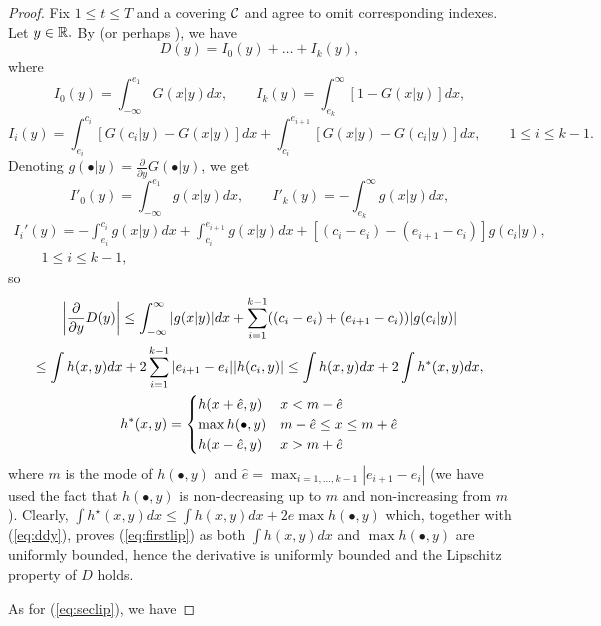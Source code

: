 \documentclass{article}              %
\begin{document}
\begin{proof}
Fix $1\leq t\leq T$ and a covering $\mathcal{C}$ and agree to omit corresponding
indexes. Let $y\in\mathbb{R}.$ By \cite{Vallander73} (or perhaps \cite{Pflug01}), we have
\[
D(y)=I_{0}(y)+\dots+I_{k}(y),
\]
where
\[
I_{0}(y)=\int_{-\infty}^{e_{1}}G(x|y)dx,\qquad I_{k}(y)=\int_{e_{k}}^{\infty}[1-G(x|y)]dx,
\]
\[
I_{i}(y)=\int_{e_{i}}^{c_{i}}[G(c_{i}|y)-G(x|y)]dx+\int_{c_{i}}^{e_{i+1}}[G(x|y)-G(c_{i}|y)]dx,
\qquad 1\leq i\leq k-1.
\]
Denoting $g(\bullet|y)=\frac{\partial}{\partial y}G(\bullet|y)$,
we get
\[
I'_{0}(y)=\int_{-\infty}^{e_{1}}g(x|y)dx,\qquad I'_{k}(y)=-\int_{e_{k}}^{\infty}g(x|y)dx,
\]
\begin{multline*}
I_{i}'(y)=-\int_{e_{i}}^{c_{i}}g(x|y)dx+\int_{c_{i}}^{e_{i+1}}g(x|y)dx+[(c_{i}-e_{i})-(e_{i+1}-c_{i})]g(c_{i}|y),\\ 
\qquad 
1\leq i\leq k-1,
\end{multline*}
so
\begin{multline}
\left|\frac{\partial}{\partial y}D(y)\right|
\leq\text{\ensuremath{\int_{-\infty}^\infty|g(x|y)|dx+
\sum_{i=1}^{k-1}((c_{i}-e_{i})+(e_{i+1}-c_{i}))}}|g(c_{i}|y)|\\
\leq\int h(x,y)dx+2\sum_{i=1}^{k-1}|e_{i+1}-e_{i}||h(c_{i},y)|\leq\int h(x,y)dx+2\int h^{*}(x,y)dx,\\
h^{*}(x,y)=\begin{cases}
h(x+\hat e,y) & x<m-\hat{e}\\
\max h(\bullet,y) & m-\hat{e}\leq x\leq m+\hat{e}\\
h(x-\hat{e},y) & x>m+\hat{e}
\end{cases}\label{eq:ddy}
\end{multline}
where $m$ is the mode of $h(\bullet,y)$ and $\hat e = \max_{i=1,\dots,k-1} |e_{i+1}-e_i|$ (we have used the fact that $h(\bullet,y)$ is non-decreasing up to $m$ and non-increasing from $m$). Clearly, $\int h^{\star}(x,y)dx\leq\int h(x,y)dx+2\hat{e}\max h(\bullet,y)$
which, together with (\ref{eq:ddy}), proves (\ref{eq:firstlip})
as both $\int h(x,y)dx$ and $\max h(\bullet,y)$ are uniformly bounded, hence
the derivative is uniformly bounded and the Lipschitz property of $D$ holds. 

As for (\ref{eq:seclip}), we have


\end{proof}
\end{document}
